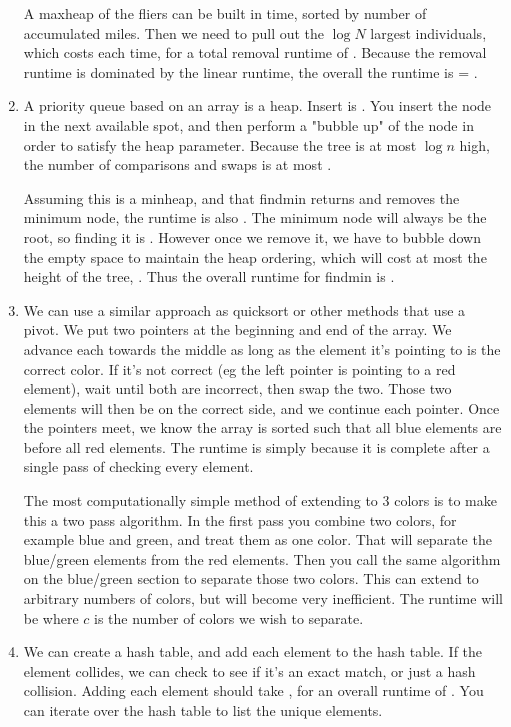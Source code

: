 \documentclass[12pt]{chmullighw}
\begin{document}
\begin{enumerate}
A maxheap of the fliers can be built in  time, sorted by number of accumulated miles. Then we need to pull out the $\log N$ largest individuals, which costs  each time, for a total removal runtime of . Because the removal runtime is dominated by the linear runtime, the overall the runtime is  = .


\item A priority queue based on an array is a heap. Insert is . You insert the node in the next available spot, and then perform a "bubble up" of the node in order to satisfy the heap parameter. Because the tree is at most $\log n$ high, the number of comparisons and swaps is at most .

Assuming this is a minheap, and that findmin returns and removes the minimum node, the runtime is also . The minimum node will always be the root, so finding it is . However once we remove it, we have to bubble down the empty space to maintain the heap ordering, which will cost at most the height of the tree, . Thus the overall runtime for findmin is .


\item We can use a similar approach as quicksort or other methods that use a pivot. We put two pointers at the beginning and end of the array. We advance each towards the middle as long as the element it's pointing to is the correct color. If it's not correct (eg the left pointer is pointing to a red element), wait until both are incorrect, then swap the two. Those two elements will then be on the correct side, and we continue each pointer. Once the pointers meet, we know the array is sorted such that all blue elements are before all red elements. The runtime is simply  because it is complete after a single pass of checking every element.

The most computationally simple method of extending to 3 colors is to make this a two pass algorithm. In the first pass you combine two colors, for example blue and green, and treat them as one color. That will separate the blue/green elements from the red elements. Then you call the same algorithm on the blue/green section to separate those two colors. This can extend to arbitrary numbers of colors, but will become very inefficient. The runtime will be  where $c$ is the number of colors we wish to separate.


\item We can create a hash table, and add each element to the hash table. If the element collides, we can check to see if it's an exact match, or just a hash collision. Adding each element should take , for an overall runtime of . You can iterate over the hash table to list the unique elements.


\end{enumerate}
\end{document}

